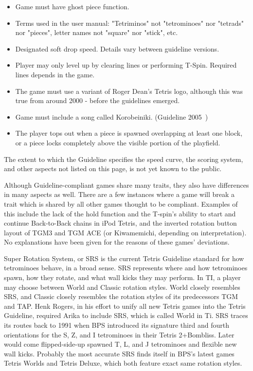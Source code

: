 \documentclass[
	12pt,				%
	openright,			%
	oneside,			%
	a4paper,			%
	brazil,				%
	]{abntex2}
\begin{document}
\begin{itemize}
  \item Game must have ghost piece function.
  \item Terms used in the user manual: "Tetriminos" not "tetrominoes" nor "tetrads" nor "pieces", letter names not "square" nor "stick", etc.
  \item Designated soft drop speed. Details vary between guideline versions.
  \item Player may only level up by clearing lines or performing T-Spin. Required lines depends in the game.
  \item The game must use a variant of Roger Dean's Tetris logo, although this was true from around 2000 - before the guidelines emerged.
  \item Game must include a song called Korobeiniki. (Guideline 2005~)
  \item The player tops out when a piece is spawned overlapping at least one block, or a piece locks completely above the visible portion of the playfield.
\end{itemize}

The extent to which the Guideline specifies the speed curve, the scoring system, and other aspects not listed on this page, is not yet known to the public.

Although Guideline-compliant games share many traits, they also have differences in many aspects as well. There are a few instances where a game will break a trait which is shared by all other games thought to be compliant. Examples of this include the lack of the hold function and the T-spin's ability to start and continue Back-to-Back chains in iPod Tetris, and the inverted rotation button layout of TGM3 and TGM ACE (or Kiwamemichi, depending on interpretation). No explanations have been given for the reasons of these games' deviations.

Super Rotation System, or SRS is the current Tetris Guideline standard for how tetrominoes behave, in a broad sense. SRS represents where and how tetrominoes spawn, how they rotate, and what wall kicks they may perform. In TI, a player may choose between World and Classic rotation styles. World closely resembles SRS, and Classic closely resembles the rotation styles of its predecessors TGM and TAP. Henk Rogers, in his effort to unify all new Tetris games into the Tetris Guideline, required Arika to include SRS, which is called World in Ti. SRS traces its routes back to 1991 when BPS introduced its signature third and fourth orientations for the S, Z, and I tetrominoes in their Tetris 2+Bombliss. Later would come flipped-side-up spawned T, L, and J tetrominoes and flexible new wall kicks. Probably the most accurate SRS finds itself in BPS's latest games Tetris Worlds and Tetris Deluxe, which both feature exact same rotation styles.
\end{document}
